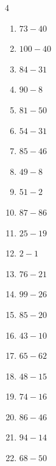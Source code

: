 \begin{multicols}{4}
\begin{enumerate}
  \item $73-40$
        \phantom{$=33$}

  \item $100-40$
        \phantom{$=60$}

  \item $84-31$
        \phantom{$=53$}

  \item $90-8$
        \phantom{$=82$}

  \item $81-50$
        \phantom{$=31$}

  \item $54-31$
        \phantom{$=23$}

  \item $85-46$
        \phantom{$=39$}

  \item $49-8$
        \phantom{$=41$}

  \item $51-2$
        \phantom{$=49$}

  \item $87-86$
        \phantom{$=1$}

  \item $25-19$
        \phantom{$=6$}

  \item $2-1$
        \phantom{$=1$}

  \item $76-21$
        \phantom{$=55$}

  \item $99-26$
        \phantom{$=73$}

  \item $85-20$
        \phantom{$=65$}

  \item $43-10$
        \phantom{$=33$}

  \item $65-62$
        \phantom{$=3$}

  \item $48-15$
        \phantom{$=33$}

  \item $74-16$
        \phantom{$=58$}

  \item $86-46$
        \phantom{$=40$}

  \item $94-14$
        \phantom{$=80$}

  \item $68-50$
        \phantom{$=18$}


\end{enumerate}
\end{multicols}
